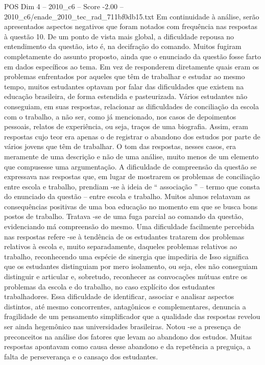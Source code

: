 \begin{textsample}{POS Dim 4 – 2010\_c6 – Score -2.00 – 2010\_c6/enade\_2010\_tec\_rad\_711bf0db15.txt}
Em continuidade à análise, serão apresentados aspectos negativos que foram notados com frequência nas respostas à questão 10.
De um ponto de vista mais global, a dificuldade repousa no entendimento da questão, isto é, na decifração do comando.
Muitos fugiram completamente do assunto proposto, ainda que o enunciado da questão fosse farto em dados específicos ao tema.
Em vez de responderem diretamente quais eram os problemas enfrentados por aqueles que têm de trabalhar e estudar ao mesmo tempo, muitos estudantes optavam por falar das dificuldades que existem na educação brasileira, de forma estendida e pasteurizada.
Vários estudantes não conseguiam, em suas respostas, relacionar as dificuldades de conciliação da escola com o trabalho, a não ser, como já mencionado, nos casos de depoimentos pessoais, relatos de experiência, ou seja, traços de uma biografia.
Assim, eram respostas cujo teor era apenas o de registrar o abandono dos estudos por parte de vários jovens que têm de trabalhar.
O tom das respostas, nesses casos, era meramente de uma descrição e não de uma análise, muito menos de um elemento que compusesse uma argumentação.
A dificuldade de compreensão da questão se expressava nas respostas que, em lugar de mostrarem os problemas de conciliação entre escola e trabalho, prendiam -se à ideia de “ associação ” – termo que consta do enunciado da questão – entre escola e trabalho.
Muitos alunos relatavam as consequências positivas de uma boa educação no momento em que se busca bons postos de trabalho.
Tratava -se de uma fuga parcial ao comando da questão, evidenciando má compreensão do mesmo.
Uma dificuldade facilmente percebida nas respostas refere -se à tendência de os estudantes tratarem dos problemas relativos à escola e, muito separadamente, daqueles problemas relativos ao trabalho, reconhecendo uma espécie de sinergia que impediria de Isso significa que os estudantes distinguiam por mero isolamento, ou seja, eles não conseguiam distinguir e articular e, sobretudo, reconhecer as convocações mútuas entre os problemas da escola e do trabalho, no caso explícito dos estudantes trabalhadores.
Essa dificuldade de identificar, associar e analisar aspectos distintos, até mesmo concorrentes, antagônicos e complementares, denuncia a fragilidade de um pensamento simplificador que a qualidade das respostas revelou ser ainda hegemônico nas universidades brasileiras.
Notou -se a presença de preconceitos na análise dos fatores que levam ao abandono dos estudos.
Muitas respostas apontavam como causa desse abandono e da repetência a preguiça, a falta de perseverança e o cansaço dos estudantes.

\end{textsample}
